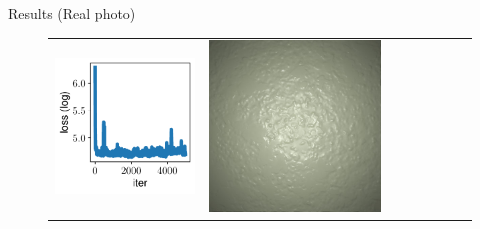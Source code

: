\documentclass[final]{beamer}
\newlength{\twocolwid}
\newlength{\resultwidth}
\begin{document}
\begin{frame}[t]
\begin{columns}[t]
\begin{column}{\twocolwid}
\begin{block}{Results (Real photo)}
\begin{figure}[t]
\begin{tabular}{ccrclccc}
            		\includegraphics[width=\resultwidth]{real/plaster/loss.pdf} &
            		\includegraphics[width=\resultwidth]{real/plaster/optim.jpg} &

\end{tabular}
\end{figure}
\end{block}
\end{column}
\end{columns}
\end{frame}
\end{document}
